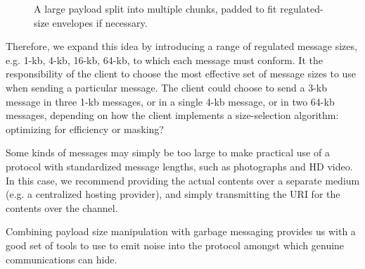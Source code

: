 \begin{figure}[h!]
    \centering
    \caption{A large payload split into multiple chunks, padded to fit regulated-size envelopes if necessary.}
    \label{fig:payload_chunks}
\end{figure}

Therefore, we expand this idea by introducing a range of regulated message sizes, e.g. 1-kb, 4-kb, 16-kb, 64-kb, to which each message must conform. It the responsibility of the client to choose the most effective set of message sizes to use when sending a particular message. The client could choose to send a 3-kb message in three 1-kb messages, or in a single 4-kb message, or in two 64-kb messages, depending on how the client implements a size-selection algorithm: optimizing for efficiency or masking?

Some kinds of messages may simply be too large to make practical use of a protocol with standardized message lengths, such as photographs and HD video. In this case, we recommend providing the actual contents over a separate medium (e.g. a centralized hosting provider), and simply transmitting the URI for the contents over the channel.

Combining payload size manipulation with garbage messaging provides us with a good set of tools to use to emit noise into the protocol amongst which genuine communications can hide.

